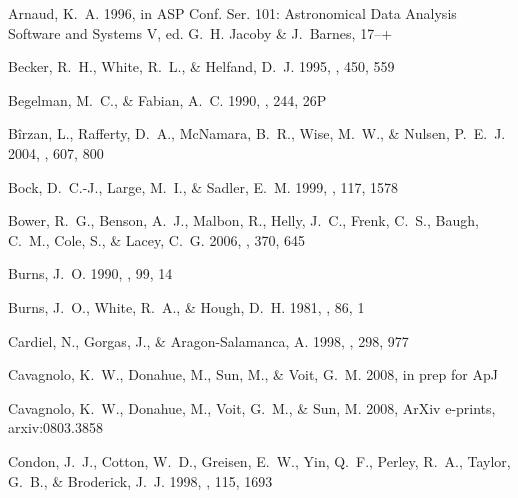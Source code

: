 \documentclass[12pt,preprint]{aastex}
\begin{document}
\begin{thebibliography}{44}

{Arnaud}, K.~A. 1996, in ASP Conf. Ser. 101: Astronomical Data Analysis
  Software and Systems V, ed. G.~H. {Jacoby} \& J.~{Barnes}, 17--+

{Becker}, R.~H., {White}, R.~L., \& {Helfand}, D.~J. 1995, \apj, 450, 559

{Begelman}, M.~C., \& {Fabian}, A.~C. 1990, \mnras, 244, 26P

{B{\^i}rzan}, L., {Rafferty}, D.~A., {McNamara}, B.~R., {Wise}, M.~W., \&
  {Nulsen}, P.~E.~J. 2004, \apj, 607, 800

{Bock}, D.~C.-J., {Large}, M.~I., \& {Sadler}, E.~M. 1999, \aj, 117, 1578

{Bower}, R.~G., {Benson}, A.~J., {Malbon}, R., {Helly}, J.~C., {Frenk}, C.~S.,
  {Baugh}, C.~M., {Cole}, S., \& {Lacey}, C.~G. 2006, \mnras, 370, 645

{Burns}, J.~O. 1990, \aj, 99, 14

{Burns}, J.~O., {White}, R.~A., \& {Hough}, D.~H. 1981, \aj, 86, 1

{Cardiel}, N., {Gorgas}, J., \& {Aragon-Salamanca}, A. 1998, \mnras, 298, 977

{Cavagnolo}, K.~W., {Donahue}, M., {Sun}, M., \& {Voit}, G.~M.
  2008{}, in prep for ApJ

{Cavagnolo}, K.~W., {Donahue}, M., {Voit}, G.~M., \& {Sun}, M.
  2008{}, ArXiv e-prints, arxiv:0803.3858

{Condon}, J.~J., {Cotton}, W.~D., {Greisen}, E.~W., {Yin}, Q.~F., {Perley},
  R.~A., {Taylor}, G.~B., \& {Broderick}, J.~J. 1998, \aj, 115, 1693


\end{thebibliography}
\end{document}
